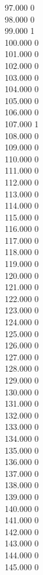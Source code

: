 { 97.000	0 \\
 98.000	0 \\
 99.000	1 \\
 100.000	0 \\
 101.000	0 \\
 102.000	0 \\
 103.000	0 \\
 104.000	0 \\
 105.000	0 \\
 106.000	0 \\
 107.000	1 \\
 108.000	0 \\
 109.000	0 \\
 110.000	0 \\
 111.000	0 \\
 112.000	0 \\
 113.000	0 \\
 114.000	0 \\
 115.000	0 \\
 116.000	0 \\
 117.000	0 \\
 118.000	0 \\
 119.000	0 \\
 120.000	0 \\
 121.000	0 \\
 122.000	0 \\
 123.000	0 \\
 124.000	0 \\
 125.000	0 \\
 126.000	0 \\
 127.000	0 \\
 128.000	0 \\
 129.000	0 \\
 130.000	0 \\
 131.000	0 \\
 132.000	0 \\
 133.000	0 \\
 134.000	0 \\
 135.000	0 \\
 136.000	0 \\
 137.000	0 \\
 138.000	0 \\
 139.000	0 \\
 140.000	0 \\
 141.000	0 \\
 142.000	0 \\
 143.000	0 \\
 144.000	0 \\
 145.000	0 \\
}
